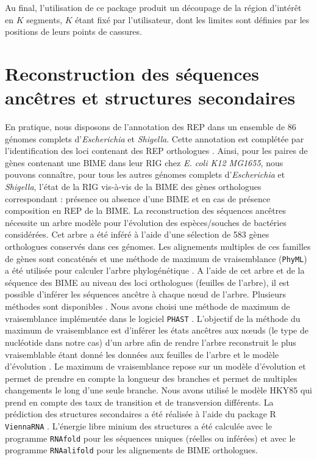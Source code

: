 \documentclass[12pt,a4paper]{report}
\begin{document}
\begin{onehalfspace}
Au final, l'utilisation de ce package produit un découpage de la région d'intérêt en $K$ segments, $K$ étant fixé par l'utilisateur, dont les limites sont définies par les positions de leurs points de cassures.

\section*{Reconstruction des séquences ancêtres et structures secondaires}

En pratique, nous disposons de l’annotation des REP dans un ensemble de 86 génomes complets d’\textit{Escherichia} et \textit{Shigella}. Cette annotation est complétée par l’identification des loci contenant des REP orthologues \citep{Weyder2013}. Ainsi, pour les paires de gènes contenant une BIME dans leur RIG chez \textit{E. coli K12 MG1655}, nous pouvons connaître, pour tous les autres génomes complets  d’\textit{Escherichia} et \textit{Shigella}, l’état de la RIG vis-à-vis de la BIME des gènes orthologues correspondant : présence ou absence d’une BIME et en cas de présence composition en REP de la BIME. 
La reconstruction des séquences ancêtres nécessite un arbre modèle pour l’évolution des espèces/souches de bactéries considérées. Cet arbre a été inféré à l’aide d’une sélection de  583 gènes orthologues conservés dans ces génomes. Les alignements multiples de ces familles de gènes sont concaténés et une méthode de maximum de vraisemblance (\texttt{PhyML}) a été utilisée pour calculer l’arbre phylogénétique \citep{Weyder2013}. A l’aide de cet arbre et de la séquence des BIME au niveau des loci orthologues (feuilles de l’arbre), il est possible d’inférer les séquences ancêtre à chaque nœud de l’arbre. Plusieurs méthodes sont disponibles \citep{Bosc2014}. Nous avons choisi une méthode de maximum de vraisemblance implémentée dans le logiciel \texttt{PHAST} \citep{Hubisz2011}. L'objectif de la méthode du maximum de vraisemblance est d’inférer les états ancêtres aux nœuds (le type de nucléotide dans notre cas) d'un arbre afin de rendre l'arbre reconstruit le plus vraisemblable étant donné les données aux feuilles de l'arbre et le modèle d'évolution \citep{Pagel1999}. Le maximum de vraisemblance repose sur un modèle d’évolution et permet de prendre en compte la longueur des branches et permet de multiples changements le long d'une seule branche. Nous avons utilisé le modèle HKY85 qui prend en compte des taux de transition et de transversion différents. 
La prédiction des structures secondaires a été réalisée à l’aide du package R \texttt{ViennaRNA} \citep{Lorenz2011}. L’énergie libre minium des structures a été calculée avec le programme \texttt{RNAfold}  pour les séquences uniques (réelles ou inférées) et avec le programme \texttt{RNAalifold} pour les alignements de BIME orthologues. 


\end{onehalfspace}
\end{document}
